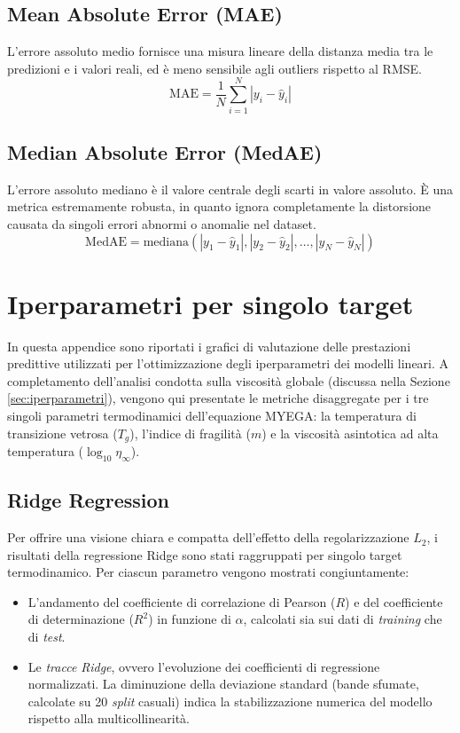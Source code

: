 \documentclass[../main.tex]{subfiles}
\begin{document}
	\section*{Mean Absolute Error (MAE)}
	L'errore assoluto medio fornisce una misura lineare della distanza media tra le predizioni e i valori reali, ed è meno sensibile agli outliers rispetto al RMSE.
	\begin{equation}
		\text{MAE} = \frac{1}{N} \sum_{i=1}^{N} |y_i - \hat{y}_i|
	\end{equation}
	
	\section*{Median Absolute Error (MedAE)}
	L'errore assoluto mediano è il valore centrale degli scarti in valore assoluto. È una metrica estremamente robusta, in quanto ignora completamente la distorsione causata da singoli errori abnormi o anomalie nel dataset.
	\begin{equation}
		\text{MedAE} = \text{mediana}(|y_1 - \hat{y}_1|, |y_2 - \hat{y}_2|, \dots, |y_N - \hat{y}_N|)
	\end{equation}
	
	
	
	\chapter{Iperparametri per singolo target}
	\label{app:grafici_iperparametri}
	
	In questa appendice sono riportati i grafici di valutazione delle prestazioni predittive utilizzati per l'ottimizzazione degli iperparametri dei modelli lineari. A completamento dell'analisi condotta sulla viscosità globale (discussa nella Sezione \ref{sec:iperparametri}), vengono qui presentate le metriche disaggregate per i tre singoli parametri termodinamici dell'equazione MYEGA: la temperatura di transizione vetrosa ($T_g$), l'indice di fragilità ($m$) e la viscosità asintotica ad alta temperatura ($\log_{10}\eta_\infty$).
	
	
	\section*{Ridge Regression}
	
	Per offrire una visione chiara e compatta dell'effetto della regolarizzazione $L_2$, i risultati della regressione Ridge sono stati raggruppati per singolo target termodinamico. Per ciascun parametro vengono mostrati congiuntamente:
	\begin{itemize}
		\item L'andamento del coefficiente di correlazione di Pearson ($R$) e del coefficiente di determinazione ($R^2$) in funzione di $\alpha$, calcolati sia sui dati di \textit{training} che di \textit{test}.
		
		\item Le \textit{tracce Ridge}, ovvero l'evoluzione dei coefficienti di regressione normalizzati. La diminuzione della deviazione standard (bande sfumate, calcolate su 20 \textit{split} casuali) indica la stabilizzazione numerica del modello rispetto alla multicollinearità.
	\end{itemize}
	
\end{document}
